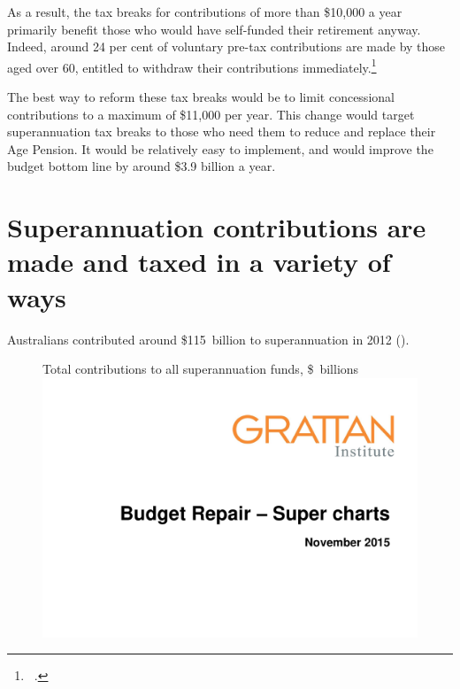 As a result, the tax breaks for contributions of more than \$10,000 a year primarily benefit those who would have self-funded their retirement anyway. Indeed, around 24 per cent of voluntary pre-tax contributions are made by those aged over 60, entitled to withdraw their contributions immediately.\footnote{\gao\ \textcite{ATO2015SampleFile1213}.\DEVIATION{}} 

The best way to reform these tax breaks would be to limit concessional contributions to a maximum of \$11,000 per year. This change would target superannuation tax breaks to those who need them to reduce and replace their Age Pension. It would be relatively easy to implement, and would improve the budget bottom line by around \$3.9 billion a year.

\section{Superannuation contributions are made and taxed in a variety of ways}
Australians contributed around \$115~billion to superannuation in 2012 (). 
\begin{figure}
%
{Total contributions to all superannuation funds, \$\ billions}\label{fig:SUPER-4-1}
\includegraphics[width=\columnwidth,page=19]{super-atlas/PPTX.pdf}
\end{figure}


